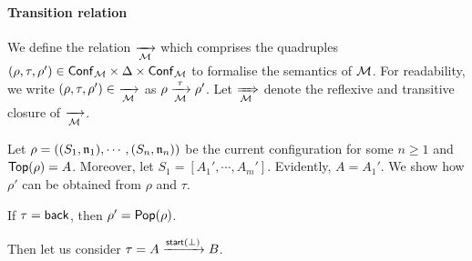 
\paragraph{Transition relation} We define the relation $\xrightarrow[{\mathcal{M} }]{}$ which comprises the quadruples $(\rho, \tau, \rho') \in {\mathsf{Conf} }_{\mathcal{M} } \times \Delta  \times {\mathsf{Conf} }_{\mathcal{M} }$ to formalise the semantics of ${\mathcal{M} }$. For readability, we write $(\rho, \tau, \rho')\in\ \xrightarrow[{\mathcal{M} }]{}$  as $\rho \xrightarrow[{\mathcal{M} }]{\tau} \rho'$. 
Let $\xRightarrow[{\mathcal{M} }]{}$ denote the reflexive and transitive closure of $\xrightarrow[{\mathcal{M} }]{}$.

Let $\rho = ((S_1,\mathfrak{n}_1),\cdots,(S_n,\mathfrak{n}_n))$ be the current configuration for some $n \ge 1$ and $\mathsf{Top}(\rho) = A$. Moreover, let $S_1 = [A_1',\cdots,A_m']$. Evidently, $A = A_1'$. We show how $\rho'$ can be obtained from $\rho$ and $\tau$.

If $\tau = {\mathsf{back} }$, then $\rho' = \mathsf{Pop}(\rho)$. 

Then let us consider $\tau = A\xrightarrow{{\mathsf{start} }(\bot)}B$.





 
 



